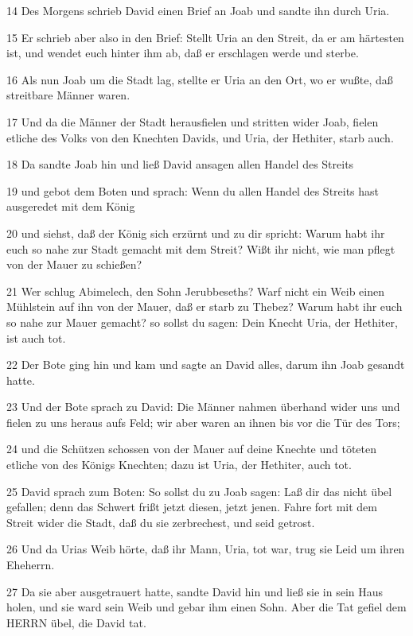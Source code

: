 \par 14 Des Morgens schrieb David einen Brief an Joab und sandte ihn durch Uria.
\par 15 Er schrieb aber also in den Brief: Stellt Uria an den Streit, da er am härtesten ist, und wendet euch hinter ihm ab, daß er erschlagen werde und sterbe.
\par 16 Als nun Joab um die Stadt lag, stellte er Uria an den Ort, wo er wußte, daß streitbare Männer waren.
\par 17 Und da die Männer der Stadt herausfielen und stritten wider Joab, fielen etliche des Volks von den Knechten Davids, und Uria, der Hethiter, starb auch.
\par 18 Da sandte Joab hin und ließ David ansagen allen Handel des Streits
\par 19 und gebot dem Boten und sprach: Wenn du allen Handel des Streits hast ausgeredet mit dem König
\par 20 und siehst, daß der König sich erzürnt und zu dir spricht: Warum habt ihr euch so nahe zur Stadt gemacht mit dem Streit? Wißt ihr nicht, wie man pflegt von der Mauer zu schießen?
\par 21 Wer schlug Abimelech, den Sohn Jerubbeseths? Warf nicht ein Weib einen Mühlstein auf ihn von der Mauer, daß er starb zu Thebez? Warum habt ihr euch so nahe zur Mauer gemacht? so sollst du sagen: Dein Knecht Uria, der Hethiter, ist auch tot.
\par 22 Der Bote ging hin und kam und sagte an David alles, darum ihn Joab gesandt hatte.
\par 23 Und der Bote sprach zu David: Die Männer nahmen überhand wider uns und fielen zu uns heraus aufs Feld; wir aber waren an ihnen bis vor die Tür des Tors;
\par 24 und die Schützen schossen von der Mauer auf deine Knechte und töteten etliche von des Königs Knechten; dazu ist Uria, der Hethiter, auch tot.
\par 25 David sprach zum Boten: So sollst du zu Joab sagen: Laß dir das nicht übel gefallen; denn das Schwert frißt jetzt diesen, jetzt jenen. Fahre fort mit dem Streit wider die Stadt, daß du sie zerbrechest, und seid getrost.
\par 26 Und da Urias Weib hörte, daß ihr Mann, Uria, tot war, trug sie Leid um ihren Eheherrn.
\par 27 Da sie aber ausgetrauert hatte, sandte David hin und ließ sie in sein Haus holen, und sie ward sein Weib und gebar ihm einen Sohn. Aber die Tat gefiel dem HERRN übel, die David tat.

